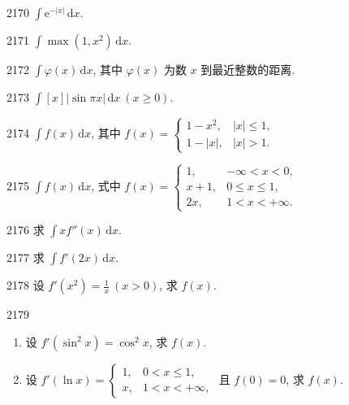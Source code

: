 \begin{prob}[S]{2170}
$\int \mathrm{e}^{-|x|} \,\mathrm{d}x$.
\end{prob}

\begin{prob}[S]{2171}
$\int \max(1, x^2) \,\mathrm{d}x$.
\end{prob}

\begin{prob}[M]{2172}
$\int \varphi(x) \,\mathrm{d}x$, 其中 $\varphi(x)$ 为数 $x$ 到最近整数的距离.
\end{prob}

\begin{prob}[M]{2173}
$\int [x]|\sin \pi x| \,\mathrm{d}x \ (x \geqslant 0)$.
\end{prob}

\begin{prob}[M]{2174}
$\int f(x) \,\mathrm{d}x$, 其中
$f(x) = \begin{cases} 1 - x^2, & |x| \leqslant 1, \\ 1 - |x|, & |x| > 1. \end{cases}$
\end{prob}

\begin{prob}[M]{2175}
$\int f(x) \,\mathrm{d}x$, 式中
$f(x) = \begin{cases} 1, & -\infty < x < 0, \\ x + 1, & 0 \leqslant x \leqslant 1, \\ 2x, & 1 < x < +\infty. \end{cases}$
\end{prob}

\begin{prob}[S]{2176}
求 $\int x f''(x) \,\mathrm{d}x$.
\end{prob}

\begin{prob}[S]{2177}
求 $\int f'(2x) \,\mathrm{d}x$.
\end{prob}

\begin{prob}[S]{2178}
设 $f'(x^2) = \frac{1}{x} \ (x > 0)$, 求 $f(x)$.
\end{prob}

\begin{prob}[M]{2179}
\begin{enumerate}[label=(\alph*), itemsep=2pt, topsep=3pt]
  \item 设 $f'(\sin^2 x) = \cos^2 x$, 求 $f(x)$.
  \item 设 $f'(\ln x) = \begin{cases} 1, & 0 < x \leqslant 1, \\ x, & 1 < x < +\infty, \end{cases}$ 且 $f(0) = 0$, 求 $f(x)$.
\end{enumerate}
\end{prob}


